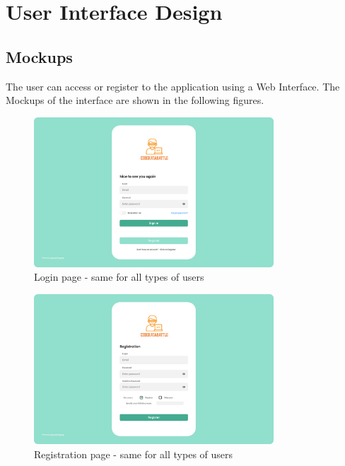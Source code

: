 \chapter{User Interface Design}

\section{Mockups}
The user can access or register to the application using a Web Interface. The Mockups of the interface 
are shown in the following figures.\\
\begin{figure}[H]
    \centering
    \includegraphics[width=0.8\textwidth]{images/user_interface/UI_sw2-01.png}
    \caption{Login page - same for all types of users}
\end{figure}

\begin{figure}[H]
    \centering
    \includegraphics[width=0.8\textwidth]{images/user_interface/UI_sw2-02.png}
    \caption{Registration page - same for all types of users}
\end{figure}

